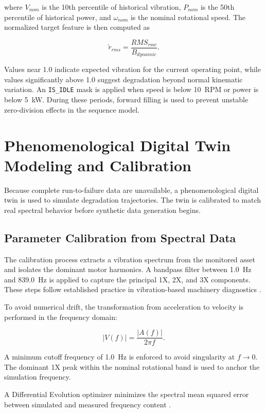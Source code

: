 \documentclass[journal,10pt,a4paper]{IEEEtran}
\begin{document}
where $V_{nom}$ is the 10th percentile of historical vibration, $P_{nom}$ is the 50th percentile of historical power, and $\omega_{nom}$ is the nominal rotational speed. The normalized target feature is then computed as

\begin{equation}
\widetilde{r}_{rms} = \frac{RMS_{raw}}{B_{dynamic}}.
\end{equation}

Values near 1.0 indicate expected vibration for the current operating point, while values significantly above 1.0 suggest degradation beyond normal kinematic variation. An \texttt{IS\_IDLE} mask is applied when speed is below \SI{10}{RPM} or power is below \SI{5}{kW}. During these periods, forward filling is used to prevent unstable zero-division effects in the sequence model.

\section{Phenomenological Digital Twin Modeling and Calibration}
Because complete run-to-failure data are unavailable, a phenomenological digital twin is used to simulate degradation trajectories. The twin is calibrated to match real spectral behavior before synthetic data generation begins.

\subsection{Parameter Calibration from Spectral Data}
The calibration process extracts a vibration spectrum from the monitored asset and isolates the dominant motor harmonics. A bandpass filter between \SI{1.0}{Hz} and \SI{839.0}{Hz} is applied to capture the principal 1X, 2X, and 3X components. These steps follow established practice in vibration-based machinery diagnostics \cite{dt_rul_mdpi,dt_bearing_semantic}.

To avoid numerical drift, the transformation from acceleration to velocity is performed in the frequency domain:

\begin{equation}
|V(f)| = \frac{|A(f)|}{2\pi f}.
\end{equation}

A minimum cutoff frequency of \SI{1.0}{Hz} is enforced to avoid singularity at $f \to 0$. The dominant 1X peak within the nominal rotational band is used to anchor the simulation frequency.

A Differential Evolution optimizer minimizes the spectral mean squared error between simulated and measured frequency content \cite{storn1997differential}. 
\end{document}
